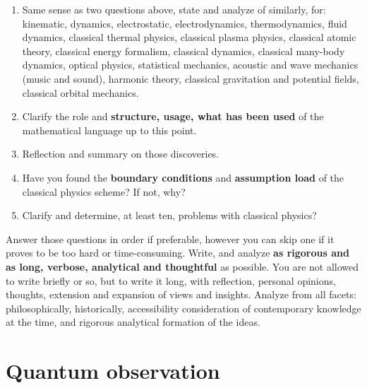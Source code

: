 \documentclass[10pt]{article}
\begin{document}
\begin{enumerate}[itemsep=1pt,topsep=1pt]
  \item Same sense as two questions above, state and analyze of similarly, for: kinematic, dynamics, electrostatic, electrodynamics, thermodynamics, fluid dynamics, classical thermal physics, classical plasma physics, classical atomic theory, classical energy formalism, classical dynamics, classical many-body dynamics, optical physics, statistical mechanics, acoustic and wave mechanics (music and sound), harmonic theory, classical gravitation and potential fields, classical orbital mechanics. 
  \item Clarify the role and \textbf{structure, usage, what has been used} of the mathematical language up to this point. 
  \item Reflection and summary on those discoveries. 
  \item Have you found the \textbf{boundary conditions} and \textbf{assumption load} of the classical physics scheme? If not, why? 
  \item Clarify and determine, at least ten, problems with classical physics? 
\end{enumerate}

Answer those questions in order if preferable, however you can skip one if it proves to be too hard or time-consuming. Write, and analyze \textbf{as rigorous and as long, verbose, analytical and thoughtful} as possible. You are not allowed to write briefly or so, but to write it long, with reflection, personal opinions, thoughts, extension and expansion of views and insights. Analyze from all facets: philosophically, historically, accessibility consideration of contemporary knowledge at the time, and rigorous analytical formation of the ideas. 

\section{Quantum observation}
\end{document}
